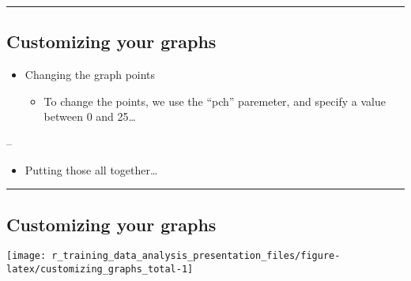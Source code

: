 \documentclass[]{article}
\newenvironment{Shaded}{\begin{snugshade}}{\end{snugshade}}
\newcommand{\DataTypeTok}[1]{\textcolor[rgb]{0.13,0.29,0.53}{#1}}
\newcommand{\DecValTok}[1]{\textcolor[rgb]{0.00,0.00,0.81}{#1}}
\newcommand{\KeywordTok}[1]{\textcolor[rgb]{0.13,0.29,0.53}{\textbf{#1}}}
\newcommand{\NormalTok}[1]{#1}
\newcommand{\OperatorTok}[1]{\textcolor[rgb]{0.81,0.36,0.00}{\textbf{#1}}}
\newcommand{\StringTok}[1]{\textcolor[rgb]{0.31,0.60,0.02}{#1}}
\providecommand{\tightlist}{%
  \setlength{\itemsep}{0pt}\setlength{\parskip}{0pt}}
\begin{document}
\begin{center}\rule{0.5\linewidth}{\linethickness}\end{center}

\hypertarget{customizing-your-graphs-2}{%
\subsection{Customizing your graphs}\label{customizing-your-graphs-2}}

\begin{itemize}
\tightlist
\item
  Changing the graph points

  \begin{itemize}
  \tightlist
  \item
    To change the points, we use the ``pch'' paremeter, and specify a
    value between 0 and 25\ldots{}
  \end{itemize}
\end{itemize}

--

\begin{Shaded}
\end{Shaded}

\begin{itemize}
\tightlist
\item
  Putting those all together\ldots{}
\end{itemize}

\begin{center}\rule{0.5\linewidth}{\linethickness}\end{center}

\hypertarget{customizing-your-graphs-3}{%
\subsection{Customizing your graphs}\label{customizing-your-graphs-3}}

\begin{center}\texttt{[image: r\_training\_data\_analysis\_presentation\_files/figure-latex/customizing\_graphs\_total-1]} \end{center}
\end{document}
